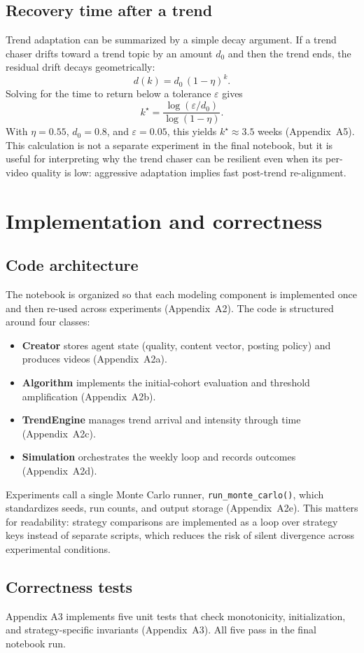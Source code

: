 \documentclass[10pt]{article}
\newcommand{\appref}[1]{(Appendix~#1)}
\begin{document}
\subsection{Recovery time after a trend}
Trend adaptation can be summarized by a simple decay argument. If a trend chaser drifts toward a trend topic by an amount \(d_0\) and then the trend ends, the residual drift decays geometrically:
\[
d(k)=d_0\,(1-\eta)^k.
\]
Solving for the time to return below a tolerance \(\varepsilon\) gives
\[
k^\star = \frac{\log(\varepsilon/d_0)}{\log(1-\eta)}.
\]
With \(\eta=0.55\), \(d_0=0.8\), and \(\varepsilon=0.05\), this yields \(k^\star \approx 3.5\) weeks \appref{A5}. This calculation is not a separate experiment in the final notebook, but it is useful for interpreting why the trend chaser can be resilient even when its per-video quality is low: aggressive adaptation implies fast post-trend re-alignment.

\section{Implementation and correctness}
\subsection{Code architecture}
The notebook is organized so that each modeling component is implemented once and then re-used across experiments \appref{A2}. The code is structured around four classes:
\begin{itemize}
  \item \textbf{Creator} stores agent state (quality, content vector, posting policy) and produces videos \appref{A2a}.
  \item \textbf{Algorithm} implements the initial-cohort evaluation and threshold amplification \appref{A2b}.
  \item \textbf{TrendEngine} manages trend arrival and intensity through time \appref{A2c}.
  \item \textbf{Simulation} orchestrates the weekly loop and records outcomes \appref{A2d}.
\end{itemize}
Experiments call a single Monte Carlo runner, \texttt{run\_monte\_carlo()}, which standardizes seeds, run counts, and output storage \appref{A2e}. This matters for readability: strategy comparisons are implemented as a loop over strategy keys instead of separate scripts, which reduces the risk of silent divergence across experimental conditions.

\subsection{Correctness tests}
Appendix A3 implements five unit tests that check monotonicity, initialization, and strategy-specific invariants \appref{A3}. All five pass in the final notebook run.
\end{document}
